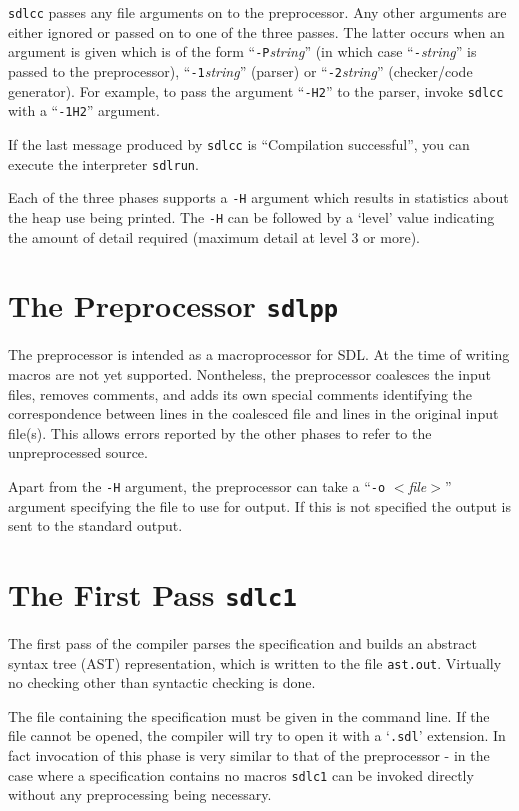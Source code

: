 {\tt sdlcc} passes any file arguments on to the preprocessor.
Any other arguments are either ignored or passed on to one of
the three passes. The latter occurs when an argument is given 
which is of the form ``{\tt -P}{\em string}'' (in which case 
``{\tt -}{\em string}'' is passed to the preprocessor), 
``{\tt -1}{\em string}'' (parser) or ``{\tt -2}{\em string}''
(checker/code generator). For example, to pass the argument
``{\tt -H2}'' to the parser, invoke {\tt sdlcc} with a ``{\tt -1H2}''
argument.

If the last message produced by {\tt sdlcc} is ``Compilation
successful'', you can execute the interpreter {\tt sdlrun}.

Each of the three phases supports a {\tt -H} argument which
results in statistics about the heap use being printed. The
{\tt -H} can be followed by a `level' value indicating the amount of detail
required (maximum detail at level 3 or more).

\section{The Preprocessor {\tt sdlpp}}

The preprocessor is intended as a macroprocessor for SDL. At the
time of writing macros are not yet supported. Nontheless, the
preprocessor coalesces the input files, removes comments, and adds
its own special comments identifying the correspondence between
lines in the coalesced file and lines in the original input file(s).
This allows errors reported by the other phases to refer to the
unpreprocessed source.

Apart from the {\tt -H} argument, the preprocessor can take a
``{\tt -o} $<${\em file}$>$'' argument specifying the file to
use for output. If this is not specified the output is sent to the
standard output.

\section{The First Pass {\tt sdlc1}}

The first pass of the compiler parses the specification and
builds an abstract syntax tree (AST) representation, which is
written to the file {\tt ast.out}. Virtually no checking other than
syntactic checking is done.

The file containing the specification must be given in the command
line. If the file cannot be opened, the compiler will try to open it
with a `{\tt .sdl}' extension. In fact invocation of this phase is
very similar to that of the preprocessor - in the case where a 
specification contains no macros {\tt sdlc1} can be invoked directly
without any preprocessing being necessary.


